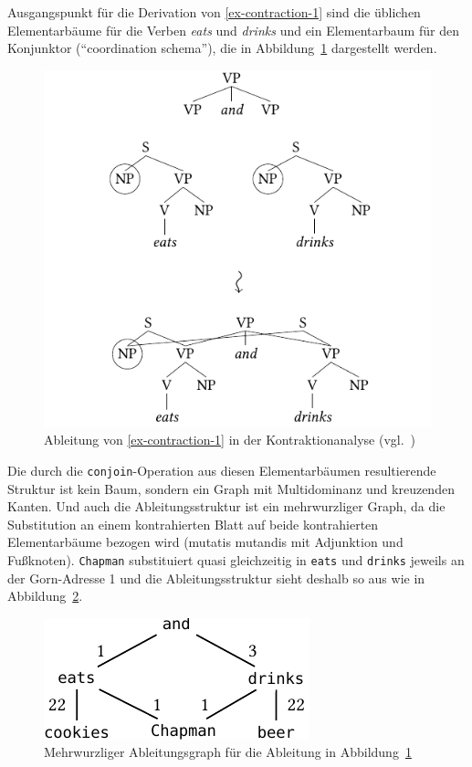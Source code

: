 Ausgangspunkt für die Derivation von \ref{ex-contraction-1} sind die üblichen Elementarbäume für die Verben {\it eats} und {\it drinks} und ein Elementarbaum für den Konjunktor ("`coordination schema"'), die in Abbildung~\ref{fig-contraction-1} dargestellt werden.
\begin{figure}[t]
\centering
\includegraphics{graphics/abb85.pdf}
\caption{\label{fig-contraction-1}Ableitung von \ref{ex-contraction-1} in der Kontraktionanalyse (vgl.\ \citealt[Abbildung~7]{Sarkar:Joshi:97})}
\end{figure}
Die durch die {\tt conjoin}-Operation aus diesen Elementarbäumen resultierende Struktur ist kein Baum, sondern ein Graph mit Multidominanz und kreuzenden Kanten. Und auch die Ableitungsstruktur ist ein mehrwurzliger Graph, da die Substitution an einem kontrahierten Blatt auf beide kontrahierten Elementarbäume bezogen wird (mutatis mutandis mit Adjunktion und Fu\ss knoten). {\tt Chapman} substituiert quasi gleichzeitig in {\tt eats} und {\tt drinks} jeweils an der Gorn-Adresse 1 und die Ableitungsstruktur sieht deshalb so aus wie in Abbildung~\ref{fig-contraction-2}.

\begin{figure}[t]
\centering
\includegraphics{graphics/abb86.pdf}
\caption{\label{fig-contraction-2}Mehrwurzliger Ableitungsgraph für die Ableitung in Abbildung~\ref{fig-contraction-1}}
\end{figure}

